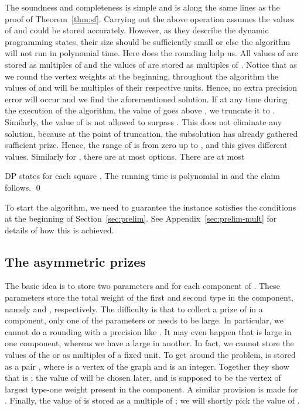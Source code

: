 \documentclass[extras,11pt]{article} \usepackage{fullpage}
\theoremstyle{mytheorem}
\newenvironment{proofof}[1]{\par\noindent{\bf #1.}\hspace{0.5em}}
    {\hfill\qed\vspace{1ex}}
\begin{document}
\begin{proofof}{\proofname\ of Theorem~\ref{thm:smpcsf}}
The soundness and completeness is simple and is along the same lines as the proof of Theorem~\ref{thm:sf}.
Carrying out the above operation assumes the values of  and  could be stored
accurately.  However, as they describe the dynamic programming states, their size should be
sufficiently small or else the algorithm will not run in polynomial time.
Here does the rounding help us.
All values of  are stored as multiples of  and the values of  are stored
as multiples of .  Notice that as we round the vertex weights at the beginning,
throughout the algorithm the values of  and  will be multiples of their respective
units.  Hence, no extra precision error will occur and we find the aforementioned solution.
If at any time during the execution of the algorithm, the value of  goes above ,
we truncate it to .  Similarly, the value of  is not allowed to surpass .
This does not eliminate any solution, because at the point of truncation, the subsolution has
already gathered sufficient prize.
Hence, the range of  is from zero up to , and this gives
 different values.
Similarly for , there are at most  options.
There are at most

\noindent DP states for each square .
The running time is polynomial in  and the claim follows.
\end{proofof}

To start the algorithm, we need to guarantee the instance satisfies
the conditions at the beginning of Section~\ref{sec:prelim}.
See Appendix~\ref{sec:prelim-mult} for details of how this is achieved.



\subsection{The asymmetric prizes}



The basic idea is to store two parameters  and  for each component of .
These parameters store the total weight of the first and second type in the component, namely  and , respectively.
The difficulty is that to collect a prize of  in a component,
only one of the parameters  or  needs to be large.
In particular, we cannot do a rounding with a precision like .
It may even happen that   is large in one component, whereas we have a large  in another.
In fact, we cannot store the values of the   or  as multiples of a fixed unit.
To get around the problem,  is stored as a pair , where  is  a vertex of the graph
and  is an integer.
Together they show that  is ;
the value of  will be chosen later, and  is supposed to be the vertex of largest
type-one weight present in the component.
A similar provision is made for .
Finally, the value of  is stored as a multiple of ;
we will shortly pick the value of .
\end{document}
